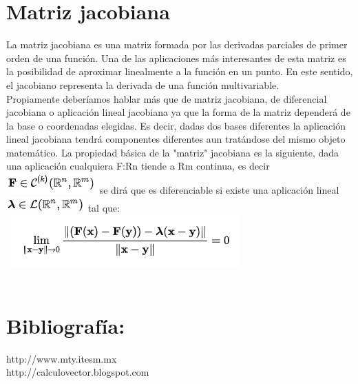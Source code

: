 \documentclass[12pt,a4paper]{article}
\begin{document}
\section{Matriz jacobiana}
La matriz jacobiana es una matriz formada por las derivadas parciales de primer orden de una función. Una de las aplicaciones más interesantes de esta matriz es la posibilidad de aproximar linealmente a la función en un punto. En este sentido, el jacobiano representa la derivada de una función multivariable.\\
Propiamente deberíamos hablar más que de matriz jacobiana, de diferencial jacobiana o aplicación lineal jacobiana ya que la forma de la matriz dependerá de la base o coordenadas elegidas. Es decir, dadas dos bases diferentes la aplicación lineal jacobiana tendrá componentes diferentes aun tratándose del mismo objeto matemático. La propiedad básica de la "matriz" jacobiana es la siguiente, dada una aplicación cualquiera F:Rn  tiende a Rm continua, es decir \includegraphics[scale=1]{1.PNG} 
se dirá que es diferenciable si existe una aplicación lineal \includegraphics[scale=1]{2.PNG}  tal que:\\
\includegraphics[scale=1]{Matriz Jacobiana.PNG} \\\\

\section{Bibliografía:}
http://www.mty.itesm.mx \\
http://calculovector.blogspot.com \\
\end{document}
